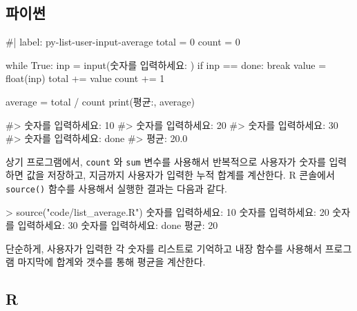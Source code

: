 \documentclass[
  letterpaper,
]{book}
\newenvironment{Shaded}{\begin{snugshade}}{\end{snugshade}}
\newcommand{\DecValTok}[1]{\textcolor[rgb]{0.68,0.00,0.00}{#1}}
\newcommand{\FunctionTok}[1]{\textcolor[rgb]{0.28,0.35,0.67}{#1}}
\newcommand{\NormalTok}[1]{\textcolor[rgb]{0.00,0.23,0.31}{#1}}
\newcommand{\SpecialCharTok}[1]{\textcolor[rgb]{0.37,0.37,0.37}{#1}}
\newcommand{\StringTok}[1]{\textcolor[rgb]{0.13,0.47,0.30}{#1}}
\begin{document}
\subsection{파이썬}

\begin{Shaded}
\begin{Highlighting}[]
\NormalTok{\#| label: py{-}list{-}user{-}input{-}average}
\NormalTok{total = 0}
\NormalTok{count = 0}

\NormalTok{while True:}
\NormalTok{    inp = input(\textquotesingle{}숫자를 입력하세요: \textquotesingle{})}
\NormalTok{    if inp == \textquotesingle{}done\textquotesingle{}:}
\NormalTok{        break}
\NormalTok{    value = float(inp)}
\NormalTok{    total += value}
\NormalTok{    count += 1}

\NormalTok{average = total / count}
\NormalTok{print(\textquotesingle{}평균:\textquotesingle{}, average)}

\NormalTok{\#\textgreater{} 숫자를 입력하세요: 10}
\NormalTok{\#\textgreater{} 숫자를 입력하세요: 20}
\NormalTok{\#\textgreater{} 숫자를 입력하세요: 30}
\NormalTok{\#\textgreater{} 숫자를 입력하세요: done}
\NormalTok{\#\textgreater{} 평균: 20.0}
\end{Highlighting}
\end{Shaded}

상기 프로그램에서, \texttt{count} 와 \texttt{sum} 변수를 사용해서
반복적으로 사용자가 숫자를 입력하면 값을 저장하고, 지금까지 사용자가
입력한 누적 합계를 계산한다. R 콘솔에서 \texttt{source()} 함수를
사용해서 실행한 결과는 다음과 같다.

\begin{Shaded}
\begin{Highlighting}[]
\SpecialCharTok{\textgreater{}} \FunctionTok{source}\NormalTok{(}\StringTok{"code/list\_average.R"}\NormalTok{)}
\NormalTok{숫자를 입력하세요}\SpecialCharTok{:} \DecValTok{10}
\NormalTok{숫자를 입력하세요}\SpecialCharTok{:} \DecValTok{20}
\NormalTok{숫자를 입력하세요}\SpecialCharTok{:} \DecValTok{30}
\NormalTok{숫자를 입력하세요}\SpecialCharTok{:}\NormalTok{ done}
\NormalTok{평균}\SpecialCharTok{:} \DecValTok{20}
\end{Highlighting}
\end{Shaded}

단순하게, 사용자가 입력한 각 숫자를 리스트로 기억하고 내장 함수를
사용해서 프로그램 마지막에 합계와 갯수를 통해 평균을 계산한다.

\subsection{R}
\end{document}
